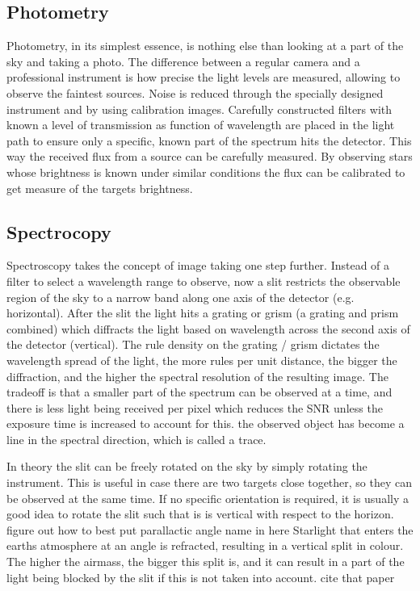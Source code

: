 \documentclass[a4paper,oneside,12pt, class=Latex/Classes/PhDthesisPSnPDF, crop=false]{standalone}
\begin{document}
\subsection{Photometry}
Photometry, in its simplest essence, is nothing else than looking at a part of the sky and taking a photo. The difference between a regular camera and a professional instrument is how precise the light levels are measured, allowing to observe the faintest sources. Noise is reduced through the specially designed instrument and by using calibration images. Carefully constructed filters with known a level of transmission as function of wavelength are placed in the light path to ensure only a specific, known part of the spectrum hits the detector. This way the received flux from a source can be carefully measured. By observing stars whose brightness is known under similar conditions the flux can be calibrated to get measure of the targets brightness.

\subsection{Spectrocopy}
Spectroscopy takes the concept of image taking one step further. Instead of a filter to select a wavelength range to observe, now a slit restricts the observable region of the sky to a narrow band along one axis of the detector (e.g. horizontal). After the slit the light hits a grating or grism (a grating and prism combined) which diffracts the light based on wavelength across the second axis of the detector (vertical). The rule density on the grating / grism dictates the wavelength spread of the light, the more rules per unit distance, the bigger the diffraction, and the higher the spectral resolution of the resulting image. The tradeoff is that a smaller part of the spectrum can be observed at a time, and there is less light being received per pixel which reduces the SNR unless the exposure time is increased to account for this. the observed object has become a line in the spectral direction, which is called a trace.

In theory the slit can be freely rotated on the sky by simply rotating the instrument. This is useful in case there are two targets close together, so they can be observed at the same time. If no specific orientation is required, it is usually a good idea to rotate the slit such that is is vertical with respect to the horizon. \color{red} figure out how to best put parallactic angle name in here \color{black} Starlight that enters the earths atmosphere at an angle is refracted, resulting in a vertical split in colour. The higher the airmass, the bigger this split is, and it can result in a part of the light being blocked by the slit if this is not taken into account. \color{red} cite that paper \color{black}
\end{document}

